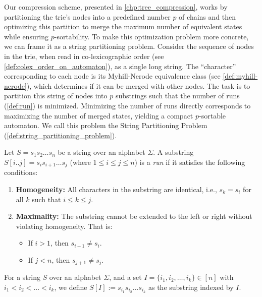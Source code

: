 Our compression scheme, presented in \cref{chp:tree_compression}, works by partitioning the trie's nodes into a predefined number $p$ of chains and then optimizing this partition to merge the maximum number of equivalent states while ensuring $p$-sortability. To make this optimization problem more concrete, we can frame it as a string partitioning problem. Consider the sequence of nodes in the trie, when read in co-lexicographic order (see \cref{def:colex_order_on_automaton}), as a single long string. The ``character'' corresponding to each node is its Myhill-Nerode equivalence class (see \cref{def:myhill-nerode}), which determines if it can be merged with other nodes. The task is to partition this string of nodes into $p$ substrings such that the number of runs (\cref{def:run}) is minimized. Minimizing the number of runs directly corresponds to maximizing the number of merged states, yielding a compact $p$-sortable automaton. We call this problem the String Partitioning Problem (\cref{def:string_partitioning_problem}).

\begin{definition}[Run]
    \label{def:run}
    Let $S = s_1s_2\ldots s_n$ be a string over an alphabet $\Sigma$. A substring $S[i..j] = s_i s_{i+1} \ldots s_j$ (where $1 \le i \le j \le n$) is a \textit{run} if it satisfies the following conditions:
    \begin{enumerate}
        \item \textbf{Homogeneity:} All characters in the substring are identical, i.e., $s_k = s_i$ for all $k$ such that $i \le k \le j$.
        \item \textbf{Maximality:} The substring cannot be extended to the left or right without violating homogeneity. That is:
        \begin{itemize}
            \item If $i > 1$, then $s_{i-1} \neq s_i$.
            \item If $j < n$, then $s_{j+1} \neq s_j$.
        \end{itemize}
    \end{enumerate}
\end{definition}

\begin{definition}
    For a string $S$ over an alphabet $\Sigma$, and a set $I=\{i_1, i_2, \ldots, i_k\} \in [n]$ with $i_1 < i_2 < \ldots < i_k$, we define $S[I] := s_{i_1} s_{i_2} \ldots s_{i_k}$ as the substring indexed by $I$.
\end{definition}

